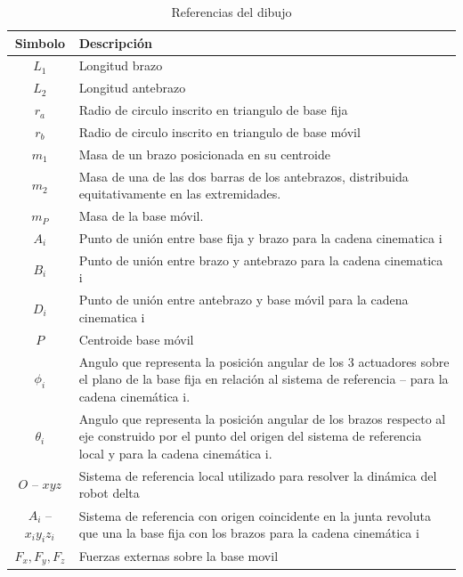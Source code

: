            \begin{table}[h]
            \centering
            \renewcommand{\arraystretch}{1.3}
                \begin{tabular}{c m{11cm}}
            \hline
                \textbf{Simbolo}& \textbf{Descripción} \\ 
            \hline             \hline
             $L_{1}$ &  Longitud brazo\\
            \hline
             $L_{2}$ & Longitud antebrazo \\
            \hline
            $ r_{a}$ &  Radio de circulo inscrito en triangulo de base fija\\
            \hline
             $r_{b}$ & Radio de circulo inscrito en triangulo de base móvil \\
            \hline
            $m_{1}$ & Masa de un brazo posicionada en su centroide \\
            \hline
             $m_{2}$ & Masa de una de las dos barras de los antebrazos, distribuida equitativamente en las extremidades. \\
            \hline
             $m_{P}$ & Masa de la base móvil. \\
            \hline
             $A_{i}$ & Punto de unión entre base fija y brazo para la cadena cinematica i \\
            \hline
             $B_{i}$ & Punto de unión entre brazo y antebrazo para la cadena cinematica i \\
            \hline
             $D_{i}$ & Punto de unión entre antebrazo y base móvil para la cadena cinematica i \\
            \hline
             $P$ & Centroide base móvil\\
            \hline
             $\phi _{i}$ & Angulo que representa la posición angular de los 3 actuadores sobre el plano de la base fija en relación al sistema de referencia  –  para la cadena cinemática i. \\
            \hline
             $\theta _{i}$ & Angulo que representa la posición angular de los brazos respecto al eje construido por el punto del origen del sistema de referencia local  y  para la cadena cinemática i.\\
            \hline
             $O$ – $xyz$ & Sistema de referencia local utilizado para resolver la dinámica del robot delta \\
            \hline
            $A_{i}$ – $x_{i}y_{i}z_{i}$ & Sistema de referencia con origen coincidente en la junta revoluta que una la base fija con los brazos para la cadena cinemática i \\
            \hline
             $F_{x},F_{y},F_{z}$ & Fuerzas externas sobre la base movil\\
            \hline
            \end{tabular}
           \caption{Referencias del dibujo}
           \label{tab:cap4_tabla_dina_ma_2}
        \end{table}
   


